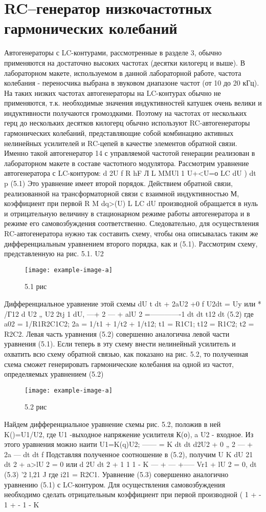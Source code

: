 ﻿\documentclass[a4paper,12pt]{article}
\begin{document}
\section{RC--генератор низкочастотных гармонических колебаний}
Автогенераторы с LC-контурами, рассмотренные в разделе 3, обычно применяются на достаточно высоких частотах (десятки килогерц и выше). В лабораторном макете, используемом в данной лабораторной работе, частота колебания - переносчика выбрана в звуковом диапазоне частот (от 10 до 20 кГц). На таких низких частотах автогенераторы на LC-контурах обычно не применяются, т.к. необходимые значения индуктивностей катушек очень велики и индуктивности получаются громоздкими. Поэтому на частотах от нескольких герц до нескольких десятков килогерц обычно используют RC-автогенераторы гармонических колебаний, представляющие собой комбинацию активных нелинейных усилителей и RC-цепей в качестве элементов обратной связи. Именно такой автогенератор
14
с управляемой частотой генерации реализован в лабораторном макете в составе частотного модулятора.
Рассмотрим уравнение автогенератора с LC-контуром:
d 2U f R
hF Л L
MMUl 1 U+<U=о
LC dU ) dt p
(5.1)
Это уравнение имеет второй порядок. Действием обратной связи, реализованной на трансформаторной связи с взаимной индуктивностью М, коэффициент при первой R M dq>(U)
L LC dU
производной
обращается в нуль и отрицательную величину в
стационарном режиме работы автогенератора и в режиме его самовозбуждения соответственно. Следовательно, для осуществления RC-автогенератора нужно так составить схему, чтобы она описывалась таким же дифференциальным уравнением второго порядка, как и (5.1).
Рассмотрим схему, представленную на рис. 5.1.
U2
\begin{figure}[H]
	\centering
	\texttt{[image: example-image-a]}
	\caption{5.1 рис}
\end{figure}
Дифференциальное уравнение этой схемы
dU	t
dt
+ 2aU2 +0 f U2dt = Uy или *	/Г12
d U2 „ U2	2tj	1 dU,
—+ 2 — + alU 2 =-------------1
dt	dt	t12 dt
(5.2)
где a02 = 1/R1R2C1C2;	2a	= 1/t1	+ 1/t2 + 1/t12;	t1	= R1C1;	t12	= R1C2;	t2	= R2C2.
Левая часть уравнения (5.2) совершенно аналогична левой части уравнения (5.1). Если теперь в эту схему внести нелинейный усилитель и охватить всю схему обратной связью, как показано на рис.	5.2, то полученная схема сможет генерировать
гармонические колебания на одной из частот, определяемых уравнением (5.2)
\begin{figure}[H]
	\centering
	\texttt{[image: example-image-a]}
	\caption{5.2 рис}
\end{figure}
Найдем дифференциальное уравнение схемы рис. 5.2, положив в ней K()=U1/U2, где U1 -выходное напряжение усилителя К(о), a U2 - входное. Из этого уравнения можно
наити U1=K(q)U2; —— = K
dt
dt
d2U2 + 0 „ 2
--- + 2a —
dt	dt
f
Подставляя полученное соотношение в (5.2), получим
U K dU
 21
dt
2 + a>lU 2 = 0 или
d 2U
dt
2
+
1	1	1 - K
— + — +-----
Vr1
 + lU 2 = 0,
dt
(5.3)
'2	l,21 J
где i21 = R2C1.
Уравнение (5.3) совершенно аналогично уравнению (5.1) с LC-контуром. Для осуществления самовозбуждения необходимо сделать отрицательным коэффициент при первой производной
(
1
+ -
1
+ -
1 - K
\end{document}
